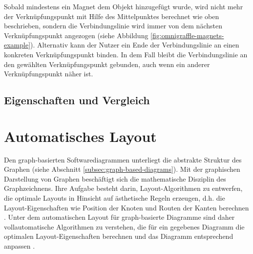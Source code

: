 Sobald mindestens ein Magnet dem Objekt hinzugefügt wurde, wird nicht mehr der Verknüpfungspunkt mit Hilfe des Mittelpunktes berechnet wie oben beschrieben, sondern die Verbindungslinie wird immer von dem nächsten Verknüpfungspunkt angezogen (siehe Abbildung \ref{fig:omnigraffle-magnets-example}). Alternativ kann der Nutzer ein Ende der Verbindungslinie an einen konkreten Verknüpfungspunkt binden. In dem Fall bleibt die Verbindungslinie an den gewählten Verknüpfungspunkt gebunden, auch wenn ein anderer Verknüpfungspunkt näher ist.

\subsection{Eigenschaften und Vergleich}





\section{Automatisches Layout}
\label{sec:automatic-layout}

Den graph-basierten Softwarediagrammen unterliegt die abstrakte Struktur des Graphen (siehe Abschnitt \ref{subsec:graph-based-diagrams}). Mit der graphischen Darstellung von Graphen beschäftigt sich die mathematische Disziplin des Graphzeichnens. Ihre Aufgabe besteht darin, Layout-Algorithmen zu entwerfen, die optimale Layouts in Hinsicht auf ästhetische Regeln erzeugen, d.h. die Layout-Eigenschaften wie Position der Knoten und Routen der Kanten berechnen \cite{Eichelberger05Aesthetics, Arvo02Techniques, Siebenhaller03Automatisches, Maier12A-Pattern-based}. Unter dem automatischen Layout für graph-basierte Diagramme sind daher vollautomatische Algorithmen zu verstehen, die für ein gegebenes Diagramm die optimalen Layout-Eigenschaften berechnen und das Diagramm entsprechend anpassen \cite{Fuhrmann11On-the-Pragmatics}.

